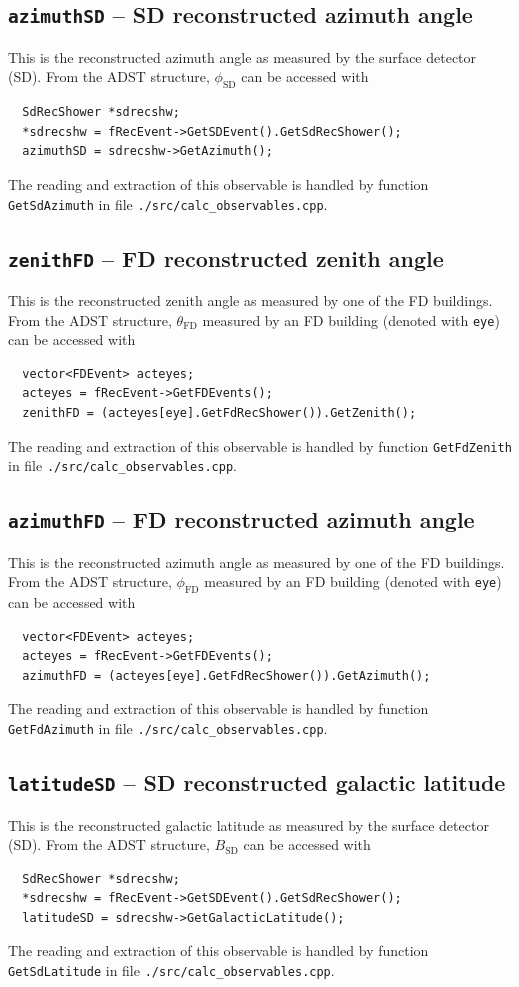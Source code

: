\documentclass[12pt,a4paper]{report}
\begin{document}
\subsection{\texttt{azimuthSD} -- SD reconstructed azimuth angle}
This is the reconstructed azimuth angle as measured by the surface detector (SD). From the ADST structure, $\phi_{\textrm{SD}}$ can be accessed with
\begin{verbatim}
  SdRecShower *sdrecshw;
  *sdrecshw = fRecEvent->GetSDEvent().GetSdRecShower();
  azimuthSD = sdrecshw->GetAzimuth();
\end{verbatim}
The reading and extraction of this observable is handled by function \texttt{GetSdAzimuth} in file \texttt{./src/calc\_observables.cpp}.

\subsection{\texttt{zenithFD} -- FD reconstructed zenith angle}
This is the reconstructed zenith angle as measured by one of the FD buildings. From the ADST structure, $\theta_{\textrm{FD}}$ measured by an FD building (denoted with \texttt{eye}) can be accessed with
\begin{verbatim}
  vector<FDEvent> acteyes;
  acteyes = fRecEvent->GetFDEvents();
  zenithFD = (acteyes[eye].GetFdRecShower()).GetZenith();
\end{verbatim}
The reading and extraction of this observable is handled by function \texttt{GetFdZenith} in file \texttt{./src/calc\_observables.cpp}.

\subsection{\texttt{azimuthFD} -- FD reconstructed azimuth angle}
This is the reconstructed azimuth angle as measured by one of the FD buildings. From the ADST structure, $\phi_{\textrm{FD}}$ measured by an FD building (denoted with \texttt{eye}) can be accessed with
\begin{verbatim}
  vector<FDEvent> acteyes;
  acteyes = fRecEvent->GetFDEvents();
  azimuthFD = (acteyes[eye].GetFdRecShower()).GetAzimuth();
\end{verbatim}
The reading and extraction of this observable is handled by function \texttt{GetFdAzimuth} in file \texttt{./src/calc\_observables.cpp}.

\subsection{\texttt{latitudeSD} -- SD reconstructed galactic latitude}
This is the reconstructed galactic latitude as measured by the surface detector (SD). From the ADST structure, $B_{\textrm{SD}}$ can be accessed with
\begin{verbatim}
  SdRecShower *sdrecshw;
  *sdrecshw = fRecEvent->GetSDEvent().GetSdRecShower();
  latitudeSD = sdrecshw->GetGalacticLatitude();
\end{verbatim}
The reading and extraction of this observable is handled by function \texttt{GetSdLatitude} in file \texttt{./src/calc\_observables.cpp}.
\end{document}
